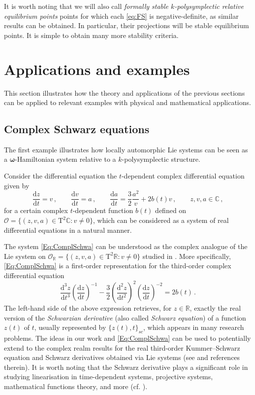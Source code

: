 \documentclass[11pt]{article}
\theoremstyle{plain}
\theoremstyle{definition}
\newcommand{\T}{\mathrm{T}}
\newcommand{\bomega}{{\boldsymbol{\omega}}}
\renewcommand{\d}{\mathrm{d}}
\def\d{\mathrm{d}}
\numberwithin{equation}{section}
\begin{document}
It is worth noting that we will also call {\it formally stable $k$-polysymplectic relative equilibrium points} points for which each \eqref{eq:FS} is negative-definite, as similar results can be obtained. In particular, their projections will be stable equilibrium points. It is simple to obtain many more stability criteria.

\section{Applications and examples}\label{Sec::examples}

This section illustrates how the theory and applications of the previous sections can be applied to relevant examples with physical and mathematical applications.

\subsection{Complex Schwarz equations}\label{Sec:ComScEq}
The first example illustrates how locally automorphic Lie systems \cite{GLMV_19} can be seen as a $\bomega$-Hamiltonian system relative to a $k$-polysymplectic structure. 

Consider the differential equation the $t$-dependent complex differential equation given by
\begin{equation}\label{Eq:ComplSchwa}
    \frac{\d z}{\d t} = v\,,\qquad \frac{\d v}{\d t} = a\,,\qquad\frac{\d a}{\d t} = \frac 32\frac{a^2}{v} + 2b(t)v\,,\qquad z,v,a\in \mathbb{C}\,,
\end{equation}
for a certain complex $t$-dependent function $b(t)$ defined on $\mathcal{O}=\{(z,v,a)
\in \T^2\mathbb{C}:v
\neq 0\}$, which can be considered as a system of real differential equations in a natural manner.

The system \eqref{Eq:ComplSchwa} can be understood as the complex analogue of the Lie system on $\mathcal{O}_\mathbb{R}=\{(z,v, a)
\in \T^2\mathbb{R}:v
\neq 0\}$ studied in \cite{LV_15}.  More specifically, \eqref{Eq:ComplSchwa} is a first-order representation for the third-order complex differential equation
$$
\frac{\d^3z}{\d t^3}\left(\frac{\d z}{\d t}\right)^{-1}-\frac{3}{2}\left(\frac{\d^2 z}{\d t^2}\right)^2\left(\frac{\d z}{\d t}\right)^{-2}=2b(t)\,.
$$
The left-hand side of the above expression retrieves, for $z\in \mathbb{R}$, exactly the real version of the {\it Schwarzian derivative} (also called {\it Schwarz equation}) of a function $z(t)$ of $t$, usually represented by  $\{z(t),t\}_{sc}$, which appears in many research problems. The ideas in our work and \eqref{Eq:ComplSchwa} can be used to potentially extend to the complex realm results for the real third-order Kummer--Schwarz equation and Schwarz derivatives obtained via Lie systems (see \cite{BC_20,LS_20} and references therein). It is worth noting that the Schwarz derivative plays a significant role in studying linearisation in time-dependent systems, projective systems, mathematical functions theory, and more (cf. \cite{GR_07, Hil_97, Leh_79}).  
\end{document}
